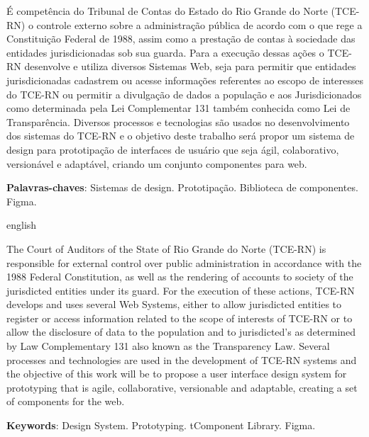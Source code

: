 \setlength{\absparsep}{18pt} %
\begin{resumo}

	É competência do Tribunal de Contas do Estado do Rio Grande do Norte (TCE-RN) o controle externo sobre a administração pública de acordo com o que rege a Constituição Federal de 1988, assim como a prestação de contas à sociedade das entidades jurisdicionadas sob sua guarda. Para a execução dessas ações o TCE-RN desenvolve e utiliza diversos Sistemas Web, seja para permitir que entidades jurisdicionadas cadastrem ou acesse informações referentes ao escopo de interesses do TCE-RN ou permitir a divulgação de dados a população e aos Jurisdicionados como determinada pela Lei Complementar 131 também conhecida como Lei de Transparência. Diversos processos e tecnologias são usados no desenvolvimento dos sistemas do TCE-RN e o objetivo deste trabalho será propor um sistema de design para prototipação de interfaces de usuário que seja ágil, colaborativo, versionável e adaptável, criando um conjunto componentes para web.

	\noindent
	\textbf{Palavras-chaves}: Sistemas de design. Prototipação. Biblioteca de componentes. Figma.
\end{resumo}
\begin{resumo}[Abstract]
	\begin{otherlanguage*}{english}

		The Court of Auditors of the State of Rio Grande do Norte (TCE-RN) is responsible for external control over public administration in accordance with the 1988 Federal Constitution, as well as the rendering of accounts to society of the jurisdicted entities under its guard. For the execution of these actions, TCE-RN develops and uses several Web Systems, either to allow jurisdicted entities to register or access information related to the scope of interests of TCE-RN or to allow the disclosure of data to the population and to jurisdicted's as determined by Law Complementary 131 also known as the Transparency Law. Several processes and technologies are used in the development of TCE-RN systems and the objective of this work will be to propose a user interface design system for prototyping that is agile, collaborative, versionable and adaptable, creating a set of components for the web.

		\vspace{\onelineskip}
		\noindent
		\textbf{Keywords}: Design System. Prototyping. tComponent Library. Figma.
	\end{otherlanguage*}
\end{resumo}